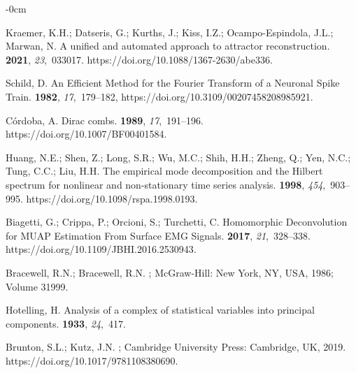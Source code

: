 \documentclass[entropy,article,accept,pdftex,moreauthors]{Definitions/mdpi}
\begin{document}
\begin{adjustwidth}{-\extralength}{0cm}
\begin{thebibliography}{999}
Kraemer, K.H.; Datseris, G.; Kurths, J.; Kiss, I.Z.; Ocampo-Espindola, J.L.;
  Marwan, N.
\newblock A unified and automated approach to attractor reconstruction.
 {\bf 2021}, {\em 23},~033017.
\newblock
  {https://doi.org/10.1088/1367-2630/abe336}.

Schild, D.
\newblock An Efficient Method for the Fourier Transform of a Neuronal Spike
  Train.
 {\bf 1982}, {\em
  17},~179--182,
\newblock
  {https://doi.org/10.3109/00207458208985921}.

C{\'o}rdoba, A.
\newblock Dirac combs.
 {\bf 1989}, {\em 17},~191--196.
\newblock
  {https://doi.org/10.1007/BF00401584}.

Huang, N.E.; Shen, Z.; Long, S.R.; Wu, M.C.; Shih, H.H.; Zheng, Q.; Yen, N.C.;
  Tung, C.C.; Liu, H.H.
\newblock The empirical mode decomposition and the Hilbert spectrum for
  nonlinear and non-stationary time series analysis.
 {\bf 1998}, {\em
  454},~903--995.
\newblock
 {https://doi.org/10.1098/rspa.1998.0193}.

Biagetti, G.; Crippa, P.; Orcioni, S.; Turchetti, C.
\newblock Homomorphic Deconvolution for MUAP Estimation From Surface EMG
  Signals.
 {\bf 2017},
  {\em 21},~328--338.
\newblock
  {https://doi.org/10.1109/JBHI.2016.2530943}.

Bracewell, R.N.; Bracewell, R.N.
;
  McGraw-Hill: New York, NY, USA, 1986; Volume 31999.

Hotelling, H.
\newblock Analysis of a complex of statistical variables into principal
  components.
 {\bf 1933}, {\em 24},~417.

Brunton, S.L.; Kutz, J.N.
; Cambridge University Press: Cambridge, UK, 2019.
\newblock
  {https://doi.org/10.1017/9781108380690}.


\end{thebibliography}
\end{adjustwidth}
\end{document}
